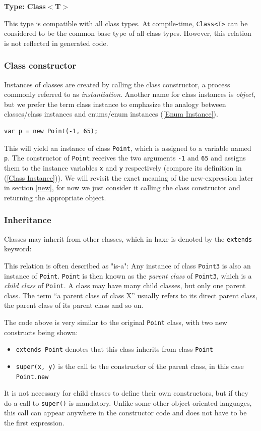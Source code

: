 \documentclass{article}
\newcommand{\type}[1]{\texttt{#1}}
\newcommand{\expr}[1]{\texttt{#1}}
\newenvironment{myshaded}
  {\def\FrameCommand{\fboxsep=\topsep\colorbox{bgcolor}}%
  \MakeFramed {\advance\hsize-\width \FrameRestore}}%
 {\endMakeFramed}
\newcommand{\define}[3][Definition]
	{\begin{myshaded}\noindent\textbf{#1: #2}\par\nobreak\noindent\ignorespaces#3\label{def:#2}\end{myshaded}}
\newcommand{\fullref}[1]{\nameref{#1} (\cref{#1})}
\begin{document}
\define[Type]{Class$<$T$>$}{This type is compatible with all class types. At compile-time, \type{Class<T>} can be considered to be the common base type of all class types. However, this relation is not reflected in generated code.}



\subsubsection{Class constructor}

Instances of classes are created by calling the class constructor, a process commonly referred to as \emph{instantiation}. Another name for class instances is \emph{object}, but we prefer the term class instance to emphasize the analogy between classes/class instances and enums/enum instances (\cref{Enum Instance}). 

\begin{lstlisting}
var p = new Point(-1, 65);
\end{lstlisting}
This will yield an instance of class \type{Point}, which is assigned to a variable named \expr{p}. The constructor of \type{Point} receives the two arguments \expr{-1} and \expr{65} and assigns them to the instance variables \expr{x} and \expr{y} respectively (compare its definition in \fullref{Class Instance}). We will revisit the exact meaning of the new-expression later in section \ref{new}, for now we just consider it calling the class constructor and returning the appropriate object.



\subsubsection{Inheritance}
\label{Inheritance}

Classes may inherit from other classes, which in haxe is denoted by the \expr{extends} keyword:


This relation is often described as "is-a": Any instance of class \type{Point3} is also an instance of \type{Point}. \type{Point} is then known as the \emph{parent class} of \type{Point3}, which is a \emph{child class} of \type{Point}. A class may have many child classes, but only one parent class. The term ``a parent class of class X'' usually refers to its direct parent class, the parent class of its parent class and so on.

The code above is very similar to the original \type{Point} class, with two new constructs being shown:
\begin{itemize}
 \item \expr{extends Point} denotes that this class inherits from class \type{Point}
 \item \expr{super(x, y)} is the call to the constructor of the parent class, in this case \expr{Point.new}
\end{itemize}
It is not necessary for child classes to define their own constructors, but if they do a call to \expr{super()} is mandatory. Unlike some other object-oriented languages, this call can appear anywhere in the constructor code and does not have to be the first expression.
\end{document}
